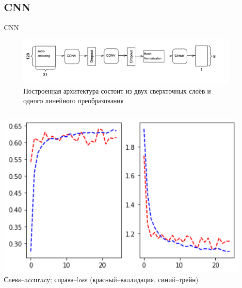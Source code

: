 \documentclass[c, aspectratio = 43]{beamer}
\begin{document}
              \subsection{CNN}          
            \begin{frame}{CNN}
                \begin{figure}[h]
                	\includegraphics[width=1\linewidth]{CNN.png}
                	Построенная архитектура состоит из двух сверхточных слоёв и одного линейного преобразования
                \end{figure}
            
            \begin{columns}
            
             \begin{column}{0.5\textwidth}  %
                
                
                    \begin{center}
                     \includegraphics[width=1\textwidth]{CNN_testandval.png}
                    \tiny Слева--accuracy; справа--loss (красный--валлидация, синий--трейн)
                     \end{center}
                \end{column}
                \begin{column}{0.5\textwidth}
                   

\end{column}
\end{columns}
\end{frame}
\end{document}
